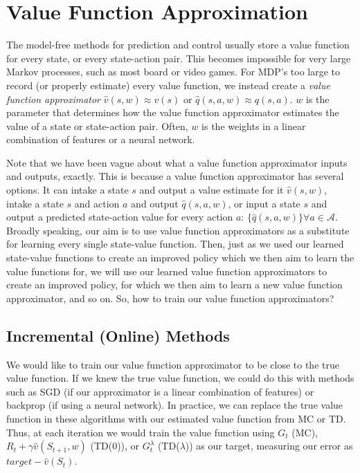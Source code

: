 \documentclass{article}
\newcommand{\ita}{\textit}
\begin{document}
\section{Value Function Approximation}

The model-free methods for prediction and control usually store a value function for every state, or every state-action pair. This becomes impossible for very large Markov processes, such as most board or video games. For MDP's too large to record (or properly estimate) every value function, we instead create a \ita{value function approximator} $\hat{v}(s, w)\approx v(s)$ or $\hat{q}(s, a, w) \approx q(s, a)$. $w$ is the parameter that determines how the value function approximator estimates the value of a state or state-action pair. Often, $w$ is the weights in a linear combination of features or a neural network.

Note that we have been vague about what a value function approximator inputs and outputs, exactly. This is because a value function approximator has several options. It can intake a state $s$ and output a value estimate for it $\hat{v}(s, w)$, intake a state $s$ and action $a$ and output $\hat{q}(s, a, w)$, or input a state $s$ and output a predicted state-action value for every action $a$: $\big\{\hat{q}(s, a, w)\big\}\forall a\in\mathcal{A}$. Broadly speaking, our aim is to use value function approximators as a substitute for learning every single state-value function. Then, just as we used our learned state-value functions to create an improved policy which we then aim to learn the value functions for, we will use our learned value function approximators to create an improved policy, for which we then aim to learn a new value function approximator, and so on. So, how to train our value function approximators?

\subsection{Incremental (Online) Methods}

We would like to train our value function approximator to be close to the true value function. If we knew the true value function, we could do this with methods such as SGD (if our approximator is a linear combination of features) or backprop (if using a neural network). In practice, we can replace the true value function in these algorithms with our estimated value function from MC or TD. Thus, at each iteration we would train the value function using $G_t$ (MC), $R_t + \gamma\hat{v}(S_{t+1}, w)$ (TD(0)), or $G^\lambda_t$ (TD($\lambda$)) as our target, measuring our error as $target - \hat{v}(S_t)$.
\end{document}
